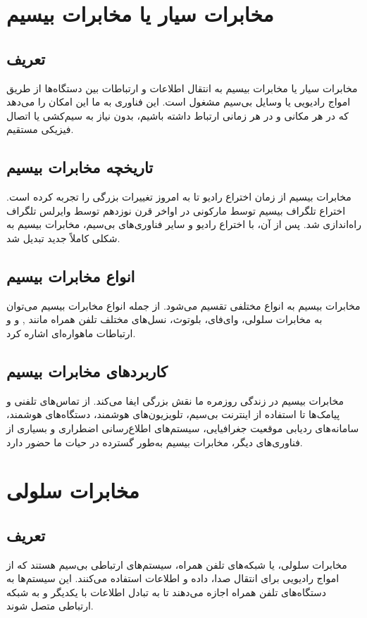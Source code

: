 \section{
	مخابرات سیار یا مخابرات بیسیم
}

\subsection{
	تعریف
}
مخابرات سیار یا مخابرات بیسیم به انتقال اطلاعات و ارتباطات بین دستگاه‌ها از طریق امواج رادیویی یا وسایل بی‌سیم مشغول است. این فناوری به ما این امکان را می‌دهد که در هر مکانی و در هر زمانی ارتباط داشته باشیم، بدون نیاز به سیم‌کشی یا اتصال فیزیکی مستقیم.

\subsection{تاریخچه مخابرات بیسیم}
مخابرات بیسیم از زمان اختراع رادیو تا به امروز تغییرات بزرگی را تجربه کرده است. اختراع تلگراف بیسیم توسط مارکونی در اواخر قرن نوزدهم توسط وایرلس تلگراف راه‌اندازی شد. پس از آن، با اختراع رادیو و سایر فناوری‌های بی‌سیم، مخابرات بیسیم به شکلی کاملاً جدید تبدیل شد.

\subsection{انواع مخابرات بیسیم}
مخابرات بیسیم به انواع مختلفی تقسیم می‌شود. از جمله انواع مخابرات بیسیم می‌توان به مخابرات سلولی، وای‌فای، بلوتوث، نسل‌های مختلف تلفن همراه مانند , 
 و 
 و ارتباطات ماهواره‌ای اشاره کرد.

\subsection{کاربردهای مخابرات بیسیم}
مخابرات بیسیم در زندگی روزمره ما نقش بزرگی ایفا می‌کند. از تماس‌های تلفنی و پیامک‌ها تا استفاده از اینترنت بی‌سیم، تلویزیون‌های هوشمند، دستگاه‌های هوشمند، سامانه‌های ردیابی موقعیت جغرافیایی، سیستم‌های اطلاع‌رسانی اضطراری و بسیاری از فناوری‌های دیگر، مخابرات بیسیم به‌طور گسترده در حیات ما حضور دارد.
\section{
	مخابرات سلولی
}

\subsection{تعریف}
مخابرات سلولی، یا شبکه‌های تلفن همراه، سیستم‌های ارتباطی بی‌سیم هستند که از امواج رادیویی برای انتقال صدا، داده و اطلاعات استفاده می‌کنند. این سیستم‌ها به دستگاه‌های تلفن همراه اجازه می‌دهند تا به تبادل اطلاعات با یکدیگر و به شبکه ارتباطی متصل شوند.

